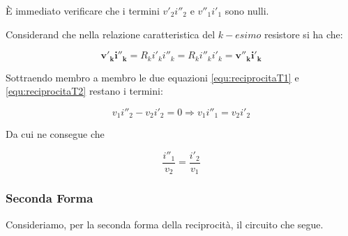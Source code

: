 \documentclass[a4paper]{report}
\begin{document}
\`E immediato verificare che i termini $v'_2i''_2$ e $v''_1i'_1$ sono
nulli.

Considerand che nella relazione caratteristica del $k-esimo$ resistore
si ha che:

\[
\mathbf{v'_ki''_k}=R_ki'_ki''_k=R_ki''_ki'_k=\mathbf{v''_ki'_k}
\]

Sottraendo membro a membro le due equazioni \ref{equ:reciprocitaT1} e
\ref{equ:reciprocitaT2} restano i termini:

\[
v_1i''_2-v_2i'_2=0 \Longrightarrow v_1i''_1=v_2i'_2
\]

Da cui ne consegue che

\[
\dfrac{i''_1}{v_2}=\dfrac{i'_2}{v_1}
\]

\subsubsection{Seconda Forma}
\label{subsec:reciprocita2}

Consideriamo, per la seconda forma della reciprocit\`a, il circuito
che segue.
\end{document}
